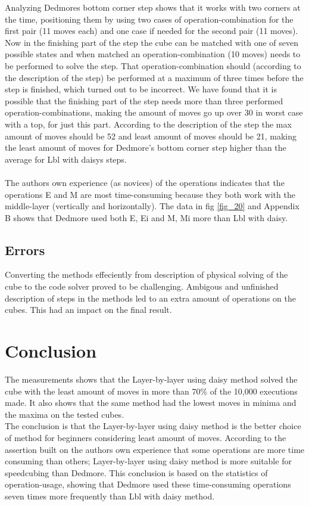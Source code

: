 \documentclass[a4paper,11pt]{kth-mag}
\begin{document}
Analyzing Dedmores bottom corner step shows that it works with two corners at the time, positioning them by using two cases of operation-combination for the first pair (11 moves each) and one case if needed for the second pair (11 moves). Now in the finishing part of the step the cube can be matched with one of seven possible states and when matched an operation-combination (10 moves) needs to be performed to solve the step. That operation-combination should (according to the description of the step) be performed at a maximum of three times before the step is finished, which turned out to be incorrect. We have found that it is possible that the finishing part of the step needs more than three performed operation-combinations, making the amount of moves go up over 30 in worst case with a top, for just this part. According to the description of the step the max amount of moves should be 52 and least amount of moves should be 21, making the least amount of moves for Dedmore's bottom corner step higher than the average for Lbl with daisys steps.\\\\   
The authors own experience (as novices) of the operations indicates that the operations E and M are most time-consuming because they both work with the middle-layer (vertically and horizontally). The data in fig \ref{fig_20} and Appendix B shows that Dedmore used both E, Ei and M, Mi more than Lbl with daisy. 		     


\section{Errors}
Converting the methods effeciently from description of physical solving of the cube to the code solver proved to be challenging. Ambigous and unfinished description of steps in the methods led to an extra amount of operations on the cubes. This had an impact on the final result.

\chapter{Conclusion}
The measurements shows that the Layer-by-layer using daisy method solved the cube with the least amount of moves in more than 70\% of the 10,000 executions made. It also shows that the same method had the lowest moves in minima and the maxima on the tested cubes.\\ The conclusion is that the Layer-by-layer using daisy method is the better choice of method for beginners considering least amount of moves. 
According to the assertion built on the authors own experience that some operations are more time consuming than others; Layer-by-layer using daisy method is more suitable for speedcubing than Dedmore. This conclusion is based on the statistics of operation-usage, showing that Dedmore used these time-consuming operations seven times more frequently than Lbl with daisy method.
\end{document}
